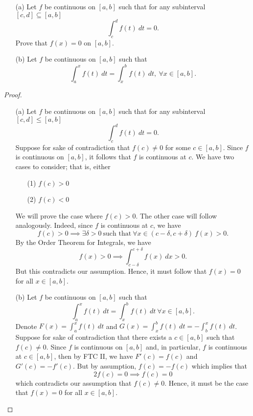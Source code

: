 \documentclass[a4paper]{article}
\begin{document}
\begin{problem}
   \begin{enumerate}
       \item[(a)] Let \( f  \) be continuous on \( [a,b] \) such that for any subinterval \( [c,d] \subseteq  [a,b] \)
           \[  \int_{ c }^{ d } f(t) \ dt = 0.  \]
           Prove that \( f(x) = 0  \) on \( [a,b] \).
       \item[(b)] Let \( f  \) be continuous on \( [a,b] \) such that 
           \[  \int_{ a }^{ x  } f(t) \ dt = \int_{ x }^{ b }  f(t) \ dt, \ \forall x \in [a,b]. \]
   \end{enumerate} 
\end{problem}
\begin{proof}
\begin{enumerate}
    \item[(a)] Let \( f  \) be continuous on \( [a,b] \) such that for any subinterval \( [c,d] \leq [a,b] \) 
        \[  \int_{ c }^{ d } f(t) \ dt = 0.  \]
        Suppose for sake of contradiction that \( f(c) \neq 0   \) for some \( c \in [a,b] \). Since \( f  \) is continuous on \( [a,b] \), it follows that \( f  \) is continuous at \( c  \). We have two cases to consider; that is, either 
        \begin{enumerate}
            \item[(1)] \( f(c) > 0  \) 
            \item[(2)] \( f(c) < 0  \)
        \end{enumerate}
        We will prove the case where \( f(c) > 0 \). The other case will follow analogously. Indeed, since \( f  \) is continuous at \( c  \), we have 
        \[  f(c) > 0 \implies \exists \delta > 0 \ \text{such that} \ \forall x \in (c - \delta, c + \delta) \ f(x) > 0.  \]
        By the Order Theorem for Integrals, we have 
        \[  f(x) > 0 \implies \int_{ c - \delta }^{  c + \delta } f(x) \ dx > 0.  \]
        But this contradicts our assumption. Hence, it must follow that \( f(x) = 0 \) for all \( x \in [a,b] \).
    \item[(b)] Let \( f  \) be continuous on \( [a,b] \) such that 
        \[  \int_{ a }^{ x } f(t) \ dt = \int_{ x }^{ b } f(t) \ dt \ \forall x \in [a,b]. \]
        Denote \( F(x) = \int_{ a }^{ x  }  f(t) \ dt  \) and \( G(x) = \int_{ x }^{ b } f(t) \ dt = -  \int_{ b }^{ x }  f(t) \ dt \). Suppose for sake of contradiction that there exists a \( c \in [a,b] \) such that \( f(c) \neq 0  \). Since \( f  \) is continuous on \( [a,b] \) and, in particular, \( f  \) is continuous at \( c \in [a,b] \), then by FTC II, we have \( F'(c) = f(c) \) and \( G'(c) = - f'(c) \). But by assumption, \( f(c) = - f(c) \) which implies that  
        \[  2f(c) = 0  \implies f(c) = 0  \]
        which contradicts our assumption that \( f(c) \neq 0  \).
        Hence, it must be the case that \( f(x) = 0  \) for all \( x \in [a,b] \).

\end{enumerate}
\end{proof}
\end{document}
